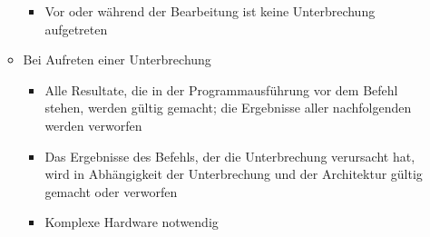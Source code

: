 \begin{itemize}
\begin{itemize}
\begin{itemize}
			\item Vor oder während der Bearbeitung ist keine Unterbrechung aufgetreten
		\end{itemize}
		\item Bei Aufreten einer Unterbrechung
		\begin{itemize}
			\item Alle Resultate, die in der Programmausführung vor dem Befehl stehen, werden gültig gemacht; die Ergebnisse aller nachfolgenden werden verworfen
			\item Das Ergebnisse des Befehls, der die Unterbrechung verursacht hat, wird in Abhängigkeit der Unterbrechung und der Architektur gültig gemacht oder verworfen
			\item Komplexe Hardware notwendig
		\end{itemize}
	\end{itemize}
\end{itemize}
